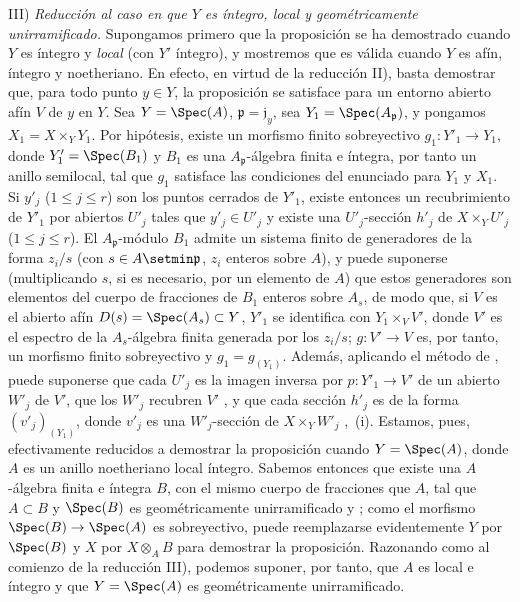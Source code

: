 III) \emph{Reducción al caso en que $Y$ es íntegro, local y geométricamente unirramificado.}
Supongamos primero que la proposición se ha demostrado cuando $Y$ es íntegro y \emph{local} (con $Y'$ íntegro), y mostremos que es válida cuando $Y$ es afín, íntegro y noetheriano.
En efecto, en virtud de la reducción II), basta demostrar que, para todo punto $y\in Y$, la proposición se satisface para un entorno abierto afín $V$ de $y$ en $Y$.
Sea $Y=\Spec(A)$, $\mathfrak{p}=\mathfrak{j}_y$, sea $Y_1=\Spec(A_\mathfrak{p})$, y pongamos $X_1=X\times_Y Y_1$.
Por hipótesis, existe un morfismo finito sobreyectivo $g_1:Y'_1\to Y_1$, donde $Y'_1=\Spec(B_1)$ y $B_1$ es una $A_\mathfrak{p}$-álgebra finita e íntegra, por tanto un anillo semilocal, tal que $g_1$ satisface las condiciones del enunciado para $Y_1$ y $X_1$.
Si $y'_j$ ($1\leq j\leq r$) son los puntos cerrados de $Y'_1$, existe entonces un recubrimiento de $Y'_1$ por abiertos $U'_j$ tales que $y'_j\in U'_j$ y existe una $U'_j$-sección $h'_j$ de $X\times_Y U'_j$ ($1\leq j\leq r$).
El $A_\mathfrak{p}$-módulo $B_1$ admite un sistema finito de generadores de la forma $z_i/s$ (con $s\in A\setmin\mathfrak{p}$,
$z_i$ enteros sobre $A$), y puede suponerse (multiplicando $s$, si es necesario, por un elemento de $A$) que estos generadores son elementos del cuerpo de fracciones de $B_1$ enteros sobre $A_s$, de modo que, si $V$ es el abierto afín $D(s)=\Spec(A_s)\subset Y$, $Y'_1$ se identifica con $Y_1\times_V V'$, donde $V'$ es el espectro de la $A_s$-álgebra finita generada por los $z_i/s$; $g:V'\to V$ es, por tanto, un morfismo finito sobreyectivo y $g_1=g_{(Y_1)}$.
Además, aplicando el método de , puede suponerse que cada $U'_j$ es la imagen inversa por $p:Y'_1\to V'$ de un abierto $W'_j$ de $V'$, que los $W'_j$ recubren $V'$ , y que cada sección $h'_j$ es de la forma $(v'_j)_{(Y_1)}$, donde $v'_j$ es una $W'_j$-sección de $X\times_Y W'_j$ ,~(i).
Estamos, pues, efectivamente reducidos a demostrar la proposición cuando $Y=\Spec(A)$, donde $A$ es un anillo noetheriano local íntegro.
Sabemos entonces que existe una $A$-álgebra finita e íntegra $B$, con el mismo cuerpo de fracciones que $A$, tal que $A\subset B$ y $\Spec(B)$ es geométricamente unirramificado  y ; como el morfismo $\Spec(B)\to\Spec(A)$ es sobreyectivo, puede reemplazarse evidentemente $Y$ por $\Spec(B)$ y $X$ por $X\otimes_A B$ para demostrar la proposición.
Razonando como al comienzo de la reducción III), podemos suponer, por tanto, que $A$ es local e íntegro y que $Y=\Spec(A)$ es geométricamente unirramificado.

